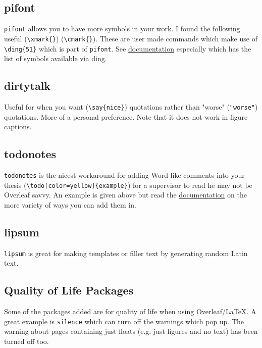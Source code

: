 \subsection{pifont}
\texttt{pifont} allows you to have more symbols in your work. I found the following useful \xmark{} (\verb|\xmark{}|) \cmark{} (\verb|\cmark{}|). These are user made commands which make use of \verb|\ding{51}| which is part of \texttt{pifont}. See \href{https://ctan.org/pkg/pifont?lang=en}{documentation} especially  which has the list of symbols available via ding.

\subsection{dirtytalk}
Useful for when you want  (\verb|\say{nice}|) quotations rather than "worse" (\verb|"worse"|) quotations. More of a personal preference. Note that it does not work in figure captions.

\subsection{todonotes}
\texttt{todonotes} is the nicest workaround for adding Word-like comments into your thesis (\verb|\todo[color=yellow]{example}|) for a supervisor to read he may not be Overleaf savvy.
An example is given above but read the \href{https://tug.ctan.org/macros/latex/contrib/todonotes/todonotes.pdf}{documentation} on the more variety of ways you can add them in.

\subsection{lipsum}
\texttt{lipsum} is great for making templates or filler text by generating random Latin text. 

\subsection{Quality of Life Packages}
Some of the packages added are for quality of life when using Overleaf/\LaTeX{}. A great example is \texttt{silence} which can turn off the  warnings which pop up. The warning about pages containing just floats (e.g. just figures and no text) has been turned off too.